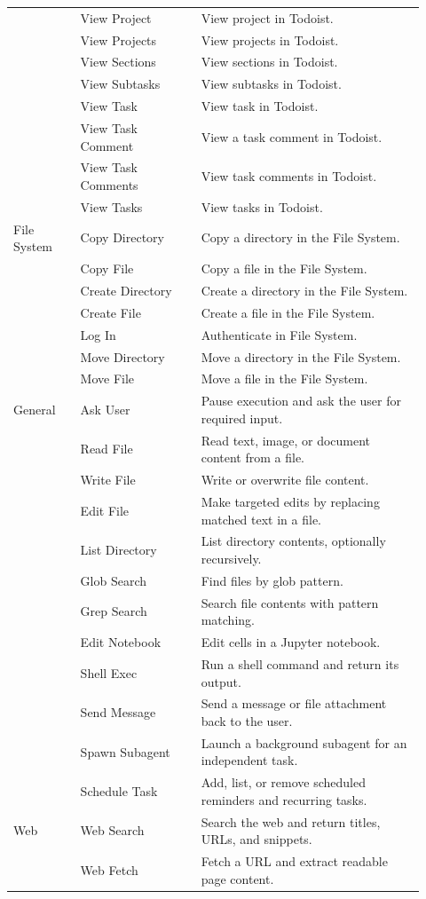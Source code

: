\begin{longtable}{@{}p{0.15\linewidth}p{0.27\linewidth}p{0.50\linewidth}@{}}
 & View Project & View project in Todoist. \\
 & View Projects & View projects in Todoist. \\
 & View Sections & View sections in Todoist. \\
 & View Subtasks & View subtasks in Todoist. \\
 & View Task & View task in Todoist. \\
 & View Task Comment & View a task comment in Todoist. \\
 & View Task Comments & View task comments in Todoist. \\
 & View Tasks & View tasks in Todoist. \\
\midrule
File System & Copy Directory & Copy a directory in the File System. \\
 & Copy File & Copy a file in the File System. \\
 & Create Directory & Create a directory in the File System. \\
 & Create File & Create a file in the File System. \\
 & Log In & Authenticate in File System. \\
 & Move Directory & Move a directory in the File System. \\
 & Move File & Move a file in the File System. \\
\midrule
General & Ask User & Pause execution and ask the user for required input. \\
 & Read File & Read text, image, or document content from a file. \\
 & Write File & Write or overwrite file content. \\
 & Edit File & Make targeted edits by replacing matched text in a file. \\
 & List Directory & List directory contents, optionally recursively. \\
 & Glob Search & Find files by glob pattern. \\
 & Grep Search & Search file contents with pattern matching. \\
 & Edit Notebook & Edit cells in a Jupyter notebook. \\
 & Shell Exec & Run a shell command and return its output. \\
 & Send Message & Send a message or file attachment back to the user. \\
 & Spawn Subagent & Launch a background subagent for an independent task. \\
 & Schedule Task & Add, list, or remove scheduled reminders and recurring tasks. \\
\midrule
Web & Web Search & Search the web and return titles, URLs, and snippets. \\
 & Web Fetch & Fetch a URL and extract readable page content. \\

\end{longtable}
\endgroup

